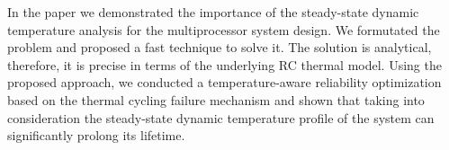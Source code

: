 In the paper we demonstrated the importance of the steady-state dynamic temperature analysis for the multiprocessor system design. We formutated the problem and proposed a fast technique to solve it. The solution is analytical, therefore, it is precise in terms of the underlying RC thermal model. Using the proposed approach, we conducted a temperature-aware reliability optimization based on the thermal cycling failure mechanism and shown that taking into consideration the steady-state dynamic temperature profile of the system can significantly prolong its lifetime.
